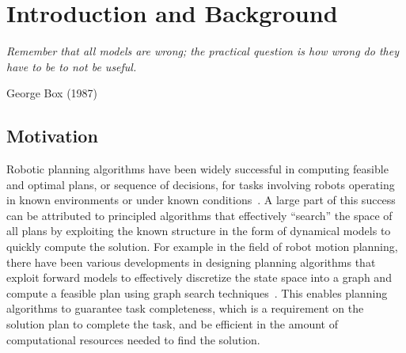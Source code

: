 
\chapter{Introduction and Background}
\label{cha:introduction}

\epigraph{\textit{Remember that all models are wrong; the practical
    question is how wrong do they have to be to not be
    useful.}}{George Box (1987)}

\section{Motivation}
\label{sec:motivation}

Robotic planning algorithms have been widely successful in computing
feasible and optimal plans, or sequence of decisions, for tasks
involving robots operating in known environments or under known
conditions~\cite{DBLP:books/cu/L2006}. A large part of this success
can be attributed to principled algorithms that effectively
``search'' the space of all plans by exploiting the known
structure in the form of dynamical models to quickly compute the
solution. For example in the field of robot motion planning, there
have been various developments in designing planning algorithms that
exploit forward models to effectively discretize the state space into
a graph and compute a feasible plan using graph search
techniques~\cite{DBLP:books/daglib/0068760}. This enables planning
algorithms to guarantee task 
completeness, which is a requirement on the solution plan to complete
the task, and be efficient in the amount of computational resources
needed to find the solution.

